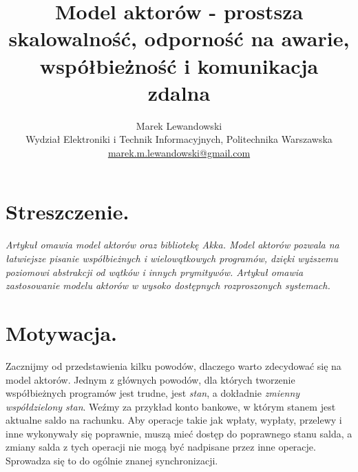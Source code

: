 \documentclass[oneside, 11pt, a4paper]{article}
\title{\vspace{15mm}\fontsize{14pt}{10pt}\selectfont\textbf{Model aktorów - prostsza skalowalność, odporność na awarie, współbieżność i komunikacja zdalna}} %
\author{
{\fontsize{12pt}{1.2em}\selectfont Marek Lewandowski} \\
{\fontsize{11pt}{1.2em}\selectfont Wydział Elektroniki i Technik Informacyjnych, Politechnika Warszawska} \\
{\fontsize{11pt}{1.2em}\selectfont \href{mailto:marek.m.lewandowski@gmail.com}{marek.m.lewandowski@gmail.com}} 
\date{}
}
\renewenvironment{abstract}
               {\list{}{}%
                \item[\textbf{Streszczenie.}]\relax}
               {\endlist}
\begin{document}
\maketitle %

\thispagestyle{fancy} %





\begin{multicols}{2} %

\section*{Streszczenie.}

\textit{
Artykuł omawia model aktorów oraz bibliotekę Akka. Model aktorów pozwala na łatwiejsze pisanie współbieżnych i wielowątkowych 
programów, dzięki wyższemu poziomowi abstrakcji od wątków i innych prymitywów. Artykuł omawia zastosowanie modelu aktorów w wysoko dostępnych rozproszonych systemach.	
}






\section{Motywacja.}

Zacznijmy od przedstawienia kilku powodów, dlaczego warto zdecydować się na model aktorów.
Jednym z głównych powodów, dla których tworzenie współbieżnych programów jest trudne, jest \emph{stan}, a dokładnie \emph{zmienny współdzielony stan}. Weźmy za przykład konto bankowe, w którym stanem jest aktualne saldo na rachunku. Aby operacje takie jak wpłaty, wypłaty, przelewy i inne wykonywały się poprawnie, muszą mieć dostęp do poprawnego stanu salda, a zmiany salda z tych operacji nie mogą być nadpisane przez inne operacje. Sprowadza się to do ogólnie znanej synchronizacji.


\end{multicols}
\end{document}
